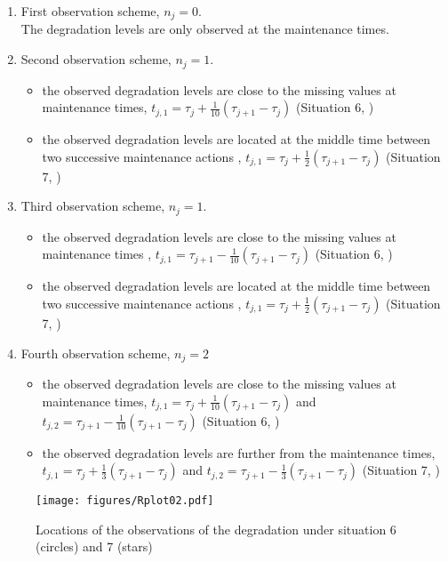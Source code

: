 \begin{enumerate}
\item First observation scheme, $n_j=0$. \\
The degradation levels are only observed at the maintenance times.
\item Second observation scheme, $n_j=1$.
\begin{itemize}
\item the observed degradation levels are close to the missing values at maintenance times, 
 $t_{j,1}=\tau_j+\frac{1}{10}(\tau_{j+1}-\tau_j)$ (Situation 6,  )
\item the observed degradation levels are located at the middle time between two successive maintenance actions , 
$t_{j,1}= \tau_j+\frac{1}{2}(\tau_{j+1}-\tau_j)$ (Situation 7,  )
\end{itemize}
\item Third observation scheme, $n_j=1$.
\begin{itemize}
\item the observed degradation levels are close to the missing values at maintenance times , 
$t_{j,1}=\tau_{j+1}-\frac{1}{10}(\tau_{j+1}-\tau_j)$ (Situation 6, )
\item the observed degradation levels are located at the middle time between two successive maintenance actions ,
$t_{j,1}= \tau_j+\frac{1}{2}(\tau_{j+1}-\tau_j)$  (Situation 7, )
\end{itemize}
\item Fourth observation scheme, 
$n_j=2$
\begin{itemize}
\item the observed degradation levels are close to the missing values at maintenance times, 
$t_{j,1}= \tau_j+\frac{1}{10}(\tau_{j+1}-\tau_j)$ and $t_{j,2}= \tau_{j+1}-\frac{1}{10} (\tau_{j+1}-\tau_j)$ (Situation 6, )
\item the observed degradation levels are further from the maintenance times,
$t_{j,1}=\tau_j+\frac{1}{3}(\tau_{j+1}-\tau_j)$ and $t_{j,2}=\tau_{j+1}-\frac{1}{3}(\tau_{j+1}-\tau_j)$ (Situation 7, ) 
\end{itemize}
\end{enumerate}

\begin{figure}[h!]
\centering
\texttt{[image: figures/Rplot02.pdf]} 
\caption{Locations of the observations of the degradation under situation 6 (circles) and  7 (stars)} 
\label{fig:laurent}
\end{figure}

